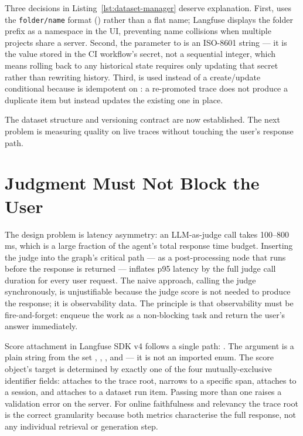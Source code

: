 Three decisions in Listing~\ref{lst:dataset-manager} deserve explanation.
First,  uses the \texttt{folder/name} format
() rather than a flat name; Langfuse
displays the folder prefix as a namespace in the UI, preventing name
collisions when multiple projects share a server.  Second, the
 parameter to  is an
ISO-8601 string --- it is the value stored in the CI workflow's
 secret, not a sequential integer, which means
rolling back to any historical state requires only updating that secret
rather than rewriting history.  Third,  is used instead
of a create/update conditional because  is idempotent on
: a re-promoted trace does not produce a duplicate item but instead
updates the existing one in place.

The dataset structure and versioning contract are now established.  The next
problem is measuring quality on live traces without touching the user's
response path.

\section{Judgment Must Not Block the User}
\label{sec:online-eval}

The design problem is latency asymmetry: an LLM-as-judge call takes
100--800\,ms, which is a large fraction of the agent's total response time
budget.  Inserting the judge into the graph's critical path --- as a
post-processing node that runs before the response is returned --- inflates
p95 latency by the full judge call duration for every user request.  The
naive approach, calling the judge synchronously, is unjustifiable because
the judge score is not needed to produce the response; it is observability
data.  The principle is that observability must be fire-and-forget: enqueue
the work as a non-blocking  task and return the user's answer
immediately.

Score attachment in Langfuse SDK v4 follows a single path:
.  The  argument is a plain
string from the set , ,
, and  --- it is not an imported enum.
The score object's target is determined by exactly one of the four
mutually-exclusive identifier fields:  attaches to the
trace root,  narrows to a specific span,
 attaches to a session, and 
attaches to a dataset run item.  Passing more than one raises a validation
error on the server.  For online faithfulness and relevancy the trace root
is the correct granularity because both metrics characterise the full
response, not any individual retrieval or generation step.

